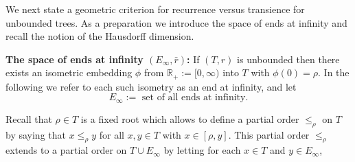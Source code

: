 \documentclass[11pt]{amsart}
\numberwithin{equation}{section}
\begin{document}
We next state a geometric criterion for recurrence versus
transience for {{\it} unbounded} trees.
As a preparation we introduce the space of ends at infinity and recall the notion of {the} {{\it} Hausdorff dimension}.{\smallskip}

 \medskip

{\bf The space of ends at infinity $(E_{\infty},\bar{r})$: }
If $(T,r)$ is unbounded then there exists an isometric embedding {$\phi$ from ${{\mathbb R}}_+:=[0,\infty)$ into $T$ with $\phi(0)=\rho$}.
In the following we refer to each {such isometry } as an {{\it} end at infinity}, and let
\begin{equation}
\label{Einfty}
   E_\infty
 :=
   \mbox{ set of all ends at infinity.}
\end{equation}

Recall that $\rho\in T$ is a fixed root which allows to define a partial order $\le_\rho$ on $T$ by saying
that $x\le_\rho y$ for all $x,y\in T$ with $x\in[\rho,y]$.
This partial order $\le_\rho$ extends to a partial order on $T\cup E_\infty$ by letting for each {$x\in T$ and $y\in E_\infty$},
\end{document}
